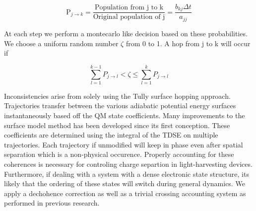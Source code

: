 \begin{equation}
  \text{P}_{j \rightarrow k} = \frac{\text{Population from j to k}}{\text{Original population of j}} = \frac{b_{kj} \Delta t}{a_{jj}}
\end{equation}

At each step we perform a montecarlo like decision based on these probabilities.
We choose a uniform random number \(\zeta\) from 0 to 1.
A hop from j to k will occur if 

\begin{equation} \label{eq:tullyjump2} 
\sum_{l=1}^{k-1}P_{j \rightarrow l} < \zeta  \le \sum_{l=1}^{k}P_{j \rightarrow l}
\end{equation}

Inconsistencies arise from solely using the Tully surface hopping approach.
 Trajectories transfer between  the various adiabatic potential energy surfaces instantaneously based off the QM state coefficients.
Many improvements to the surface model method has been developed since its first conception.\cite{fang1999improvement}
 These coefficients are determined using the integral of the TDSE on multiple trajectories.
 Each trajectory if unmodified will keep in phase even after spatial separation which is a non-physical occurence. \cite{joos2013decoherence,landry2011communication,nelson2013nonadiabatic}
Properly accounting for these coherences is necessary for controling charge separtion in light-harvesting devices.\cite{rozzi2013quantum}
 Furthermore, if dealing with a system with a dense electronic state structure, its likely that the ordering of these states will switch during general dynamics.
 We apply a dechohence correction as well as a trivial crossing accounting system as performed in previous research.
